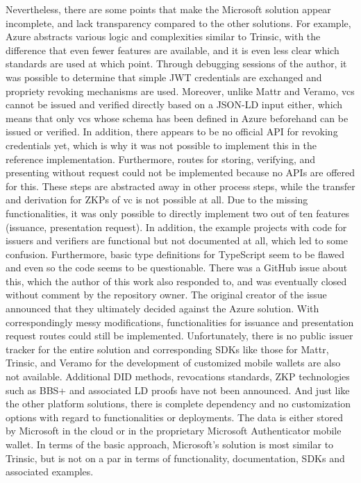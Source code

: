         Nevertheless, there are some points that make the Microsoft solution appear incomplete, and lack transparency compared to the other solutions. For example, Azure abstracts various logic and complexities similar to Trinsic, with the difference that even fewer features are available, and it is even less clear which standards are used at which point. Through debugging sessions of the author, it was possible to determine that simple JWT credentials are exchanged and propriety revoking mechanisms are used. Moreover, unlike Mattr and Veramo, \acp{vc} cannot be issued and verified directly based on a JSON-LD input either, which means that only \acp{vc} whose schema has been defined in Azure beforehand can be issued or verified. In addition, there appears to be no official API for revoking credentials yet, which is why it was not possible to implement this in the reference implementation. Furthermore, routes for storing, verifying, and presenting without request could not be implemented because no APIs are offered for this. These steps are abstracted away in other process steps, while the transfer and derivation for \acp{ZKP} of \ac{vc} is not possible at all. Due to the missing functionalities, it was only possible to directly implement two out of ten features (issuance, presentation request). In addition, the example projects with code for issuers and verifiers are functional but not documented at all, which led to some confusion. Furthermore, basic type definitions for TypeScript seem to be flawed and even so the code seems to be questionable. There was a GitHub issue \cite{yegupov_demo_2021} about this, which the author of this work also responded to, and was eventually closed without comment by the repository owner. The original creator of the issue announced that they ultimately decided against the Azure solution. With correspondingly messy modifications, functionalities for issuance and presentation request routes could still be implemented. Unfortunately, there is no public issuer tracker for the entire solution and corresponding SDKs like those for Mattr, Trinsic, and Veramo for the development of customized mobile wallets are also not available. Additional \ac{DID} methods, revocations standards, \ac{ZKP} technologies such as BBS+ and associated LD proofs have not been announced. And just like the other platform solutions, there is complete dependency and no customization options with regard to functionalities or deployments. The data is either stored by Microsoft in the cloud or in the proprietary Microsoft Authenticator mobile wallet. In terms of the basic approach, Microsoft's solution is most similar to Trinsic, but is not on a par in terms of functionality, documentation, SDKs and associated examples.

